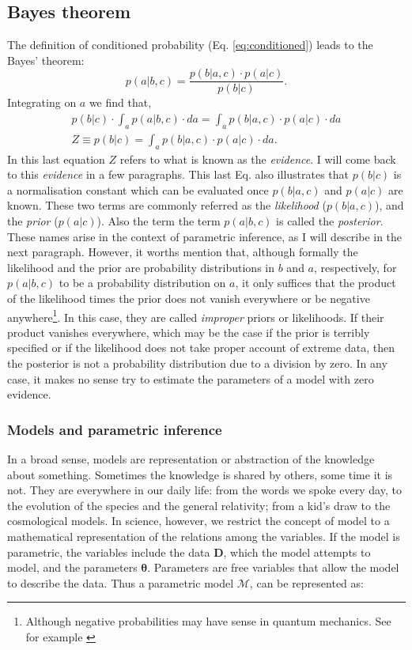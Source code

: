 \subsection{Bayes theorem}
The definition of conditioned probability (Eq. \ref{eq:conditioned}) leads to the Bayes' theorem:
\begin{equation}
p(a|b,c) = \frac{p(b|a,c)\cdot p(a|c)}{p(b|c)}.
\end{equation}
Integrating on $a$ we find that,
\begin{align}
\label{eq:evidence}
p(b|c) \cdot \int_a p(a|b,c)\cdot da = \int_a p(b|a,c) \cdot p(a|c) \cdot da \nonumber \\
Z \equiv p(b|c) = \int_a p(b|a,c) \cdot p(a|c) \cdot da.
\end{align}
In this last equation $Z$ refers to what is known as the \emph{evidence}. I will come back to this \emph{evidence} in a few paragraphs. This last Eq. also illustrates that $p(b|c)$ is a normalisation constant which can be evaluated once $p(b|a,c)$ and $p(a|c)$ are known. These two terms are commonly referred as the \emph{likelihood}  ($p(b|a,c)$), and the \emph{prior} ($p(a|c)$). Also the term the term $p(a|b,c)$ is called the \emph{posterior}. These names arise in the context of parametric inference, as I will describe in the next paragraph. However, it worths mention that, although formally the likelihood and the prior are probability distributions in $b$ and $a$, respectively, for $p(a|b,c)$ to be a probability distribution on $a$, it only suffices that the product of the likelihood times the prior does not vanish everywhere or be negative anywhere\footnote{Although negative probabilities may have sense in quantum mechanics. See for example \citep{1942RSPSA.180....1D}}. In this case, they are called \emph{improper} priors or likelihoods. If their product vanishes everywhere, which may be the case if the prior is terribly specified or if the likelihood does not take proper account of extreme data, then the posterior is not a probability distribution due to a division by zero. In any case, it makes no sense try to estimate the parameters of a model with zero evidence.

\subsubsection{Models and parametric inference}
In a broad sense, models are representation or abstraction of the knowledge about something. Sometimes the knowledge is shared by others, some time it is not. They are everywhere in our daily life: from the words we spoke every day, to the evolution of the species and the general relativity; from a kid's draw to the cosmological models. In science, however, we restrict the concept of model to a mathematical representation of the relations among the variables. If the model is parametric, the variables include the data $\mathbf{D}$, which the model attempts to model, and the parameters $\mathbf{\theta}$. Parameters are free variables that allow the model to describe the data. Thus a parametric model $\mathcal{M}$, can be represented as:

